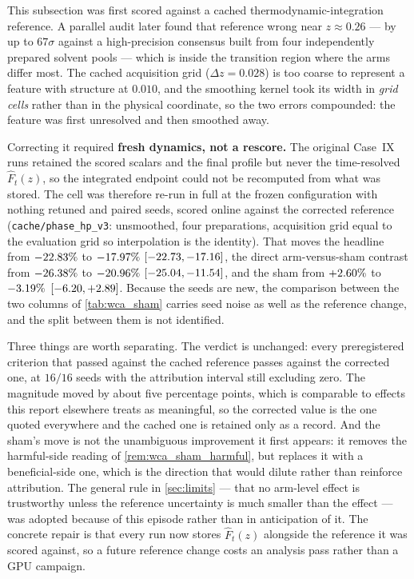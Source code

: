 \begin{remark}
\label{rem:wca_reference_correction}
This subsection was first scored against a cached thermodynamic-integration reference. A
parallel audit later found that reference wrong near $z\approx0.26$ --- by up to $67\sigma$
against a high-precision consensus built from four independently prepared solvent pools ---
which is inside the transition region where the arms differ most. The cached acquisition grid
($\Delta z = 0.028$) is too coarse to represent a feature with structure at $0.010$, and the
smoothing kernel took its width in \emph{grid cells} rather than in the physical coordinate,
so the two errors compounded: the feature was first unresolved and then smoothed away.

Correcting it required \textbf{fresh dynamics, not a rescore.} The original Case~IX runs
retained the scored scalars and the final profile but never the time-resolved
$\hat F_t(z)$, so the integrated endpoint could not be recomputed from what was stored. The
cell was therefore re-run in full at the frozen configuration with nothing retuned and
\WcsSeeds{} paired seeds, scored online against the corrected reference
(\texttt{cache/phase\_hp\_v3}: unsmoothed, four preparations, acquisition grid equal to the
evaluation grid so interpolation is the identity). That moves the headline from
$-22.83\%$ to $-17.97\%$ $[-22.73, -17.16]$, the direct arm-versus-sham
contrast from $-26.38\%$ to $-20.96\%$ $[-25.04, -11.54]$, and the
sham from $+2.60\%$ to $-3.19\%$ $[-6.20, +2.89]$. Because the
seeds are new, the comparison between the two columns of \cref{tab:wca_sham} carries seed
noise as well as the reference change, and the split between them is not identified.

Three things are worth separating. The verdict is unchanged: every preregistered criterion
that passed against the cached reference passes against the corrected one, at $16/16$ seeds
with the attribution interval still excluding zero. The magnitude moved by about five
percentage points, which is comparable to effects this report elsewhere treats as meaningful,
so the corrected value is the one quoted everywhere and the cached one is retained only as a
record. And the sham's move is not the unambiguous improvement it first appears: it removes
the harmful-side reading of \cref{rem:wca_sham_harmful}, but replaces it with a
beneficial-side one, which is the direction that would dilute rather than reinforce
attribution. The general rule in \cref{sec:limits} --- that no arm-level effect is trustworthy
unless the reference uncertainty is much smaller than the effect --- was adopted because of
this episode rather than in anticipation of it. The concrete repair is that every run now
stores $\hat F_t(z)$ alongside the reference it was scored against, so a future reference
change costs an analysis pass rather than a GPU campaign.
\end{remark}

